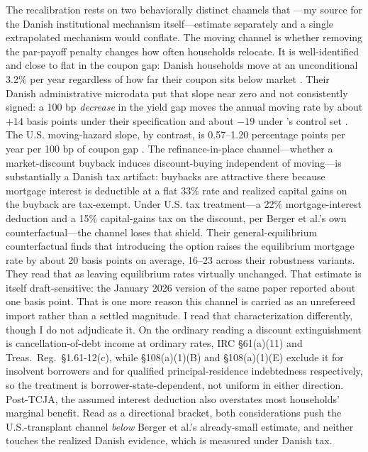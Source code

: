 \documentclass[12pt]{article}
\begin{document}
The recalibration rests on two behaviorally distinct channels that \citet{berger2026}---my source for the Danish institutional mechanism itself---estimate separately and a single extrapolated mechanism would conflate. The moving channel is whether removing the par-payoff penalty changes how often households relocate. It is well-identified and close to flat in the coupon gap: Danish households move at an unconditional 3.2\% per year regardless of how far their coupon sits below market \citep[\S4.6, structural parameters in tab.~3]{berger2026}. Their Danish administrative microdata put that slope near zero and not consistently signed: a 100 bp \emph{decrease} in the yield gap moves the annual moving rate by about $+14$ basis points under their specification and about $-19$ under \citeauthor{fonseca2024}'s control set \citep[\S3.3.2]{berger2026}. The U.S. moving-hazard slope, by contrast, is 0.57--1.20 percentage points per year per 100 bp of coupon gap \citep{fonseca2024}. The refinance-in-place channel---whether a market-discount buyback induces discount-buying independent of moving---is substantially a Danish tax artifact: buybacks are attractive there because mortgage interest is deductible at a flat 33\% rate and realized capital gains on the buyback are tax-exempt. Under U.S. tax treatment---a 22\% mortgage-interest deduction and a 15\% capital-gains tax on the discount, per Berger et al.'s own counterfactual---the channel loses that shield. Their general-equilibrium counterfactual \citep[\S4.10.2]{berger2026} finds that introducing the option raises the equilibrium mortgage rate by about 20 basis points on average, 16--23 across their robustness variants. They read that as leaving equilibrium rates virtually unchanged. That estimate is itself draft-sensitive: the January 2026 version of the same paper reported about one basis point. That is one more reason this channel is carried as an unrefereed import rather than a settled magnitude. I read that characterization differently, though I do not adjudicate it. On the ordinary reading a discount extinguishment is cancellation-of-debt income at ordinary rates, IRC \S 61(a)(11) and Treas.\ Reg.\ \S 1.61-12(c), while \S 108(a)(1)(B) and \S 108(a)(1)(E) exclude it for insolvent borrowers and for qualified principal-residence indebtedness respectively, so the treatment is borrower-state-dependent, not uniform in either direction. Post-TCJA, the assumed interest deduction also overstates most households' marginal benefit. Read as a directional bracket, both considerations push the U.S.-transplant channel \emph{below} Berger et al.'s already-small estimate, and neither touches the realized Danish evidence, which is measured under Danish tax.
\end{document}
